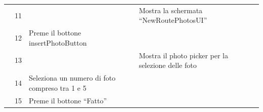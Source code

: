\documentclass{natourDoc}
\begin{document}
\begin{tabularx}{\linewidth}{| l | p{1cm} | p{4cm} | X | X|}
	\cline{2-5}                   & 11                                                                                                                                     &                                                                                                                                                                      & Mostra la schermata “NewRoutePhotosUI”              &                                                                                       \\

	\cline{2-5}                   & 12                                                                                                                                     & Preme il bottone insertPhotoButton                                                                                                                                   &                                                     &                                                                                       \\

	\cline{2-5}                   & 13                                                                                                                                     &                                                                                                                                                                      & Mostra il photo picker per la selezione delle foto  &                                                                                       \\

	\cline{2-5}                   & 14                                                                                                                                     & Seleziona un numero di foto compreso tra 1 e 5                                                                                                                       &                                                     &                                                                                       \\

	\cline{2-5}                   & 15                                                                                                                                     & Preme il bottone “Fatto”                                                                                                                                             &                                                     &                                                                                       \\


\end{tabularx}
\end{document}
